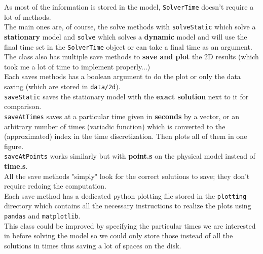 \documentclass{article}
\begin{document}
As most of the information is stored in the model, \texttt{SolverTime} doesn't require a lot of methods. \\
The main ones are, of course, the solve methods with \texttt{solveStatic} which solve a \textbf{stationary} model and \texttt{solve} which solves a \textbf{dynamic} model and will use the final time set in the \texttt{SolverTime} object or can take a final time as an argument. \\

The class also has multiple save methods to \textbf{save and plot} the 2D results (which took me a lot of time to implement properly...) \\
Each saves methods has a boolean argument to do the plot or only the data saving (which are stored in \texttt{data/2d}).\\ 

\texttt{saveStatic} saves the stationary model with the \textbf{exact solution} next to it for comparison.\\ 

\texttt{saveAtTimes} saves at a particular time given in \textbf{seconds} by a vector, or an arbitrary number of times (variadic function) which is converted to the (approximated) index in the time discretization. Then plots all of them in one figure.\\  

\texttt{saveAtPoints} works similarly but with \textbf{point.s} on the physical model instead of \textbf{time.s}. \\

All the save methods "simply" look for the correct solutions to save; they don't require redoing the computation. \\
Each save method has a dedicated python plotting file stored in the \texttt{plotting} directory which contains all the necessary instructions to realize the plots using \texttt{pandas} and \texttt{matplotlib}. \\

This class could be improved by specifying the particular times we are interested in before solving the model so we could only store those instead of all the solutions in times thus saving a lot of spaces on the disk.
\end{document}
